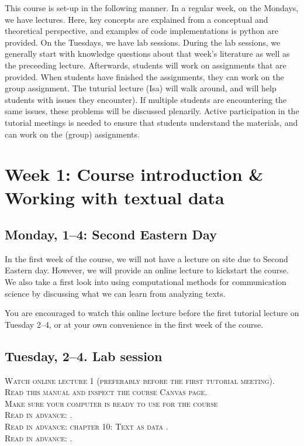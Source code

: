This course is set-up in the following manner. In a regular week, on the Mondays, we have lectures. Here, key concepts are explained from a conceptual and theoretical perspective, and examples of code implementations is python are provided.  On the Tuesdays, we have lab sessions. During the lab sessions, we generally start with knowledge questions about that week's literature as well as the preceeding lecture. Afterwards, students will work on assignments that are provided. When students have finished the assignments, they can work on the group assignment. The tuturial lecture (Isa) will walk around, and will help students with issues they encounter). If multiple students are encountering the same issues, these problems will be discussed plenarily. Active participation in the tutorial meetings is needed to ensure that students understand the materials, and can work on the (group) assignments.

\section*{Week 1: Course introduction \& Working with textual data}

\subsection*{Monday, 1--4:  Second Eastern Day}

In the first week of the course, we will not have a lecture on site due to Second Eastern day. However, we will provide an online lecture to kickstart the course. We also take a first look into using computational methods for communication science by discussing what we can learn from analyzing texts. 

You are encouraged to watch this online lecture  before the first tutorial lecture on Tuesday 2--4, or at your own convenience in the first week of the course. 


\subsection*{Tuesday, 2--4. Lab session}

\textsc{ Watch online lecture 1 (preferably before the first tutorial meeting).}\\
\textsc{ Read this manual and inspect the course Canvas page.}\\
\textsc{ Make sure your computer is ready to use for the course }\\
\textsc{ Read in advance: \cite{Hirschenberg2015}.} \\
\textsc{Read in advance: chapter 10: Text as data \cite{van_atteveldt_computational_2022}.} \\
\textsc{Read in advance: \cite{Boumans2016}.} \\

